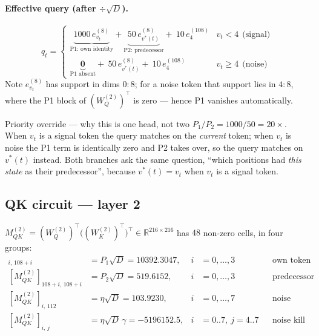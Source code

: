 \documentclass[11pt]{article}
\newcommand{\R}{\mathbb{R}}
\newcommand{\Wq}{W_Q}
\newcommand{\Wk}{W_K}
\newcommand{\sd}{\sqrt{D}}
\begin{document}
\paragraph{Effective query (after $\div\sd$).}
\begin{equation}
q_{t}=
\begin{cases}
\underbrace{1000\,e^{(8)}_{v_t}}_{\text{P1: own identity}}
+\underbrace{50\,e^{(8)}_{v^*(t)}}_{\text{P2: predecessor}}
+\ 10\,e^{(108)}_4 & v_t<4\ \ \text{(signal)}\\[1.4em]
\underbrace{\bm{0}}_{\text{P1 absent}}
+\ 50\,e^{(8)}_{v^*(t)}+\ 10\,e^{(108)}_4 & v_t\ge4\ \ \text{(noise)}
\end{cases}
\end{equation}
Note $e^{(8)}_{v_t}$ has support in dims $0{:}8$; for a noise token that support lies in
$4{:}8$, where the P1 block of $(\Wq^{(2)})^\top$ is zero --- hence P1 vanishes automatically.

\begin{warningbox}{Priority override --- why this is one head, not two}
$P_1/P_2=1000/50=20\times$. When $v_t$ is a signal token the query matches on the
\emph{current} token; when $v_t$ is noise the P1 term is identically zero and P2 takes over, so
the query matches on $v^*(t)$ instead. Both branches ask the same question, ``which positions had
\emph{this state} as their predecessor'', because $v^*(t)=v_t$ when $v_t$ is a signal token.
\end{warningbox}

\subsection{QK circuit --- layer 2}
$M^{(2)}_{QK}=(\Wq^{(2)})^\top\bigl((\Wk^{(2)})^\top\bigr)^\top\in\R^{216\times216}$ has $48$
non-zero cells, in four groups:
\begin{align}
[M^{(2)}_{QK}]_{i,\,108+i}&=P_1\sd=10392.3047, & i&=0,\dots,3 &&\text{own token vs.\ predecessor}\\
[M^{(2)}_{QK}]_{108+i,\,108+i}&=P_2\sd=519.6152, & i&=0,\dots,3 &&\text{predecessor vs.\ predecessor}\\
[M^{(2)}_{QK}]_{i,\,112}&=\eta\sd=103.9230, & i&=0,\dots,7 &&\text{noise trigger}\\
[M^{(2)}_{QK}]_{i,\,j}&=\eta\sd\,\gamma=-5196152.5, & i&=0..7,\ j=4..7 &&\text{noise kill}
\end{align}
\end{document}
